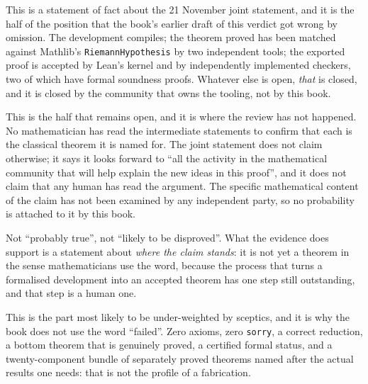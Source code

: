 \begin{description}[style=nextline,leftmargin=0pt,labelwidth=0pt,labelsep=0pt,font=\sffamily\bfseries\small,
  itemsep=6pt]
\item[\textbf{Formally certified.}] This is a statement of fact about the
21 November joint statement, and it is the half of the position that the
book's earlier draft of this verdict got wrong by omission. The development
compiles; the theorem proved has been matched against Mathlib's
\texttt{RiemannHypothesis} by two independent tools; the exported proof is
accepted by Lean's kernel and by independently implemented checkers, two of
which have formal soundness proofs. Whatever else is open, \emph{that} is
closed, and it is closed by the community that owns the tooling, not by this
book.

\item[\textbf{Mathematically unaudited.}] This is the half that remains open,
and it is where the review has not happened. No mathematician has read the
intermediate statements to confirm that each is the classical theorem it is
named for. The joint statement does not claim otherwise; it says it looks
forward to ``all the activity in the mathematical community that will help
explain the new ideas in this proof'', and it does not claim that any human
has read the argument. The specific mathematical content of the claim has
not been examined by any independent party, so no probability is attached to
it by this book.

\item[\textbf{Not refuted.}] Not ``probably true'', not ``likely to be
disproved''. What the evidence does support is a statement about \emph{where
the claim stands}: it is not yet a theorem in the sense mathematicians use the
word, because the process that turns a formalised development into an accepted
theorem has one step still outstanding, and that step is a human one.

\item[\textbf{Serious.}] This is the part most likely to be under-weighted by
sceptics, and it is why the book does not use the word ``failed''. Zero
axioms, zero \texttt{sorry}, a correct reduction, a bottom theorem that is
genuinely proved, a certified formal status, and a twenty-component bundle of
separately proved theorems named after the actual results one needs: that is
not the profile of a fabrication.

\end{description}

